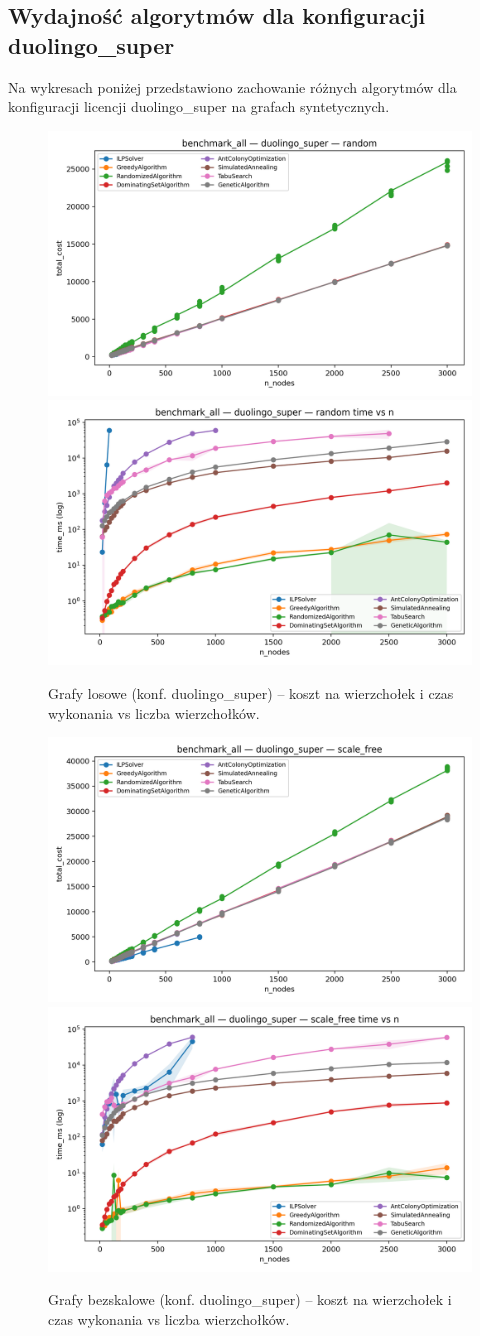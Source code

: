 \subsection{Wydajność algorytmów dla konfiguracji duolingo\_super}

Na wykresach poniżej przedstawiono zachowanie różnych algorytmów dla konfiguracji licencji duolingo\_super na grafach syntetycznych.

\begin{figure}[H]
  \centering
  \includegraphics[width=0.48\linewidth]{assets/figures/ba_random_duo_cost_vs_n.png}
  \includegraphics[width=0.48\linewidth]{assets/figures/ba_random_duo_time_vs_n.png}
  \caption{Grafy losowe (konf. duolingo\_super) -- koszt na wierzchołek i czas wykonania vs liczba wierzchołków.}
  \label{fig:random_performance}
\end{figure}

\begin{figure}[H]
  \centering
  \includegraphics[width=0.48\linewidth]{assets/figures/ba_scale_free_duo_cost_vs_n.png}
  \includegraphics[width=0.48\linewidth]{assets/figures/ba_scale_free_duo_time_vs_n.png}
  \caption{Grafy bezskalowe (konf. duolingo\_super) -- koszt na wierzchołek i czas wykonania vs liczba wierzchołków.}
  \label{fig:scale_free_performance}
\end{figure}

